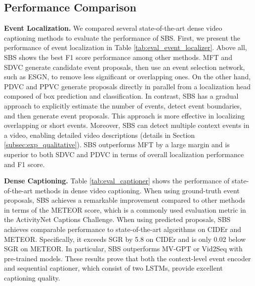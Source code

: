 \subsection{Performance Comparison}
\label{subsec:exp_comparison}

\textbf{Event Localization.}
We compared several state-of-the-art dense video captioning methods to evaluate the performance of SBS. First, we present the performance of event localization in Table \ref{tab:eval_event_localizer}.
Above all, SBS shows the best F1 score performance among other methods.
MFT and SDVC generate candidate event proposals, then use an event selection network, such as ESGN, to remove less significant or overlapping ones. On the other hand, PDVC and PPVC generate proposals directly in parallel from a localization head composed of box prediction and classification.
In contrast, SBS has a gradual approach to explicitly estimate the number of events, detect event boundaries, and then generate event proposals. This approach is more effective in localizing overlapping or short events.
Moreover, SBS can detect multiple context events in a video, enabling detailed video descriptions (details in Section \ref{subsec:exp_qualitative}).
SBS outperforms MFT by a large margin and is superior to both SDVC and PDVC in terms of overall localization performance and F1 score.

\textbf{Dense Captioning.}
Table \ref{tab:eval_captioner} shows the performance of state-of-the-art methods in dense video captioning.
When using ground-truth event proposals, SBS achieves a remarkable improvement compared to other methods in terms of the METEOR score, which is a commonly used evaluation metric in the ActivityNet Captions Challenge.
When using predicted proposals, SBS achieves comparable performance to state-of-the-art algorithms on CIDEr and METEOR.
Specifically, it exceeds SGR by 5.8 on CIDEr and is only 0.02 below SGR on METEOR.
In particular, SBS outperforms MV-GPT or Vid2Seq with pre-trained models.
These results prove that both the context-level event encoder and sequential captioner, which consist of two LSTMs, provide excellent captioning quality.

